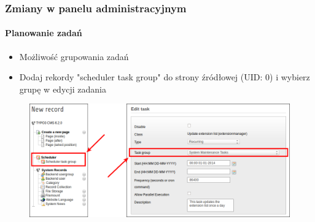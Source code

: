 \begin{frame}[fragile]
	\frametitle{Zmiany w panelu administracyjnym}
	\framesubtitle{Planowanie zadań}

	\begin{itemize}
		\item Możliwość grupowania zadań
		\item Dodaj rekordy "scheduler task group" do strony źródłowej (UID: 0)\newline
			i wybierz grupę w edycji zadania
	\end{itemize}

	\begin{figure}
		\includegraphics[width=0.85\linewidth]{Images/BackendChanges/SchedulerTaskGroup.png}
	\end{figure}

\end{frame}


